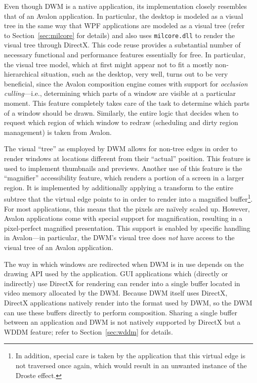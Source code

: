\documentclass[10pt,twocolumn,a4paper]{article}
\begin{document}
			Even though DWM is a native application, its implementation closely
			resembles that of an Avalon application. In particular, the desktop
			is modeled as a visual tree in the same way that WPF applications
			are modeled as a visual tree (refer to Section~\ref{sec:milcore}
			for details) and also uses \texttt{milcore.dll} to render the
			visual tree through DirectX. This code reuse provides a
			substantial number of necessary functional and performance
			features essentially for free.  In particular, the visual tree
			model, which at first might appear not to fit a mostly
			non-hierarchical situation, such as the desktop, very well,
			turns out to be very beneficial, since the Avalon composition
			engine comes with support for \emph{occlusion culling}---i.e.,
			determining which parts of a window are visible at a particular
			moment. This feature completely takes care of the task to
			determine which parts of a window should be drawn. Similarly, the
			entire logic that decides when to request which region of which window
			to redraw (scheduling and dirty region management) is taken from
			Avalon.
			\cite{dwmwpf}

			The visual \enquote{tree} as employed by DWM allows for non-tree edges
			in order to render windows at locations different from their \enquote{actual}
			position. This feature is used to implement thumbnails and previews.
			Another use of this feature is the \enquote{magnifier} accessibility
			feature, which renders a portion of a screen in a larger region.
			It is implemented by additionally applying a transform to the entire
			subtree that the virtual edge points to in order to render into a
			magnified buffer\footnote{In addition, special care is taken by the
			application
			that this virtual edge is not traversed once again, which would result
			in an unwanted instance of the Droste effect.}.
			For most applications, this means that the pixels are naïvely scaled
			up. However, Avalon applications come with special support for magnification,
			resulting in a pixel-perfect magnified presentation. This support
			is enabled by specific handling in Avalon---in particular, the DWM's
			visual tree does \emph{not} have access to the visual tree of an
			Avalon application.
			\cite{goingdeep}

			The way in which windows are redirected when DWM is in use depends
			on the drawing API used by the application. GUI applications which
			(directly or indirectly)
			use DirectX for rendering can render into a single buffer located
			in video memory allocated
			by the DWM. Because DWM itself uses DirectX, DirectX applications
			natively render into the format used by DWM, so the DWM can use
			these buffers directly to perform composition. Sharing a single buffer
			between an application and DWM is not natively supported by DirectX
			but a WDDM feature; refer to Section~\ref{sec:wddm} for details.
			\cite{dwmredirect}
\end{document}
